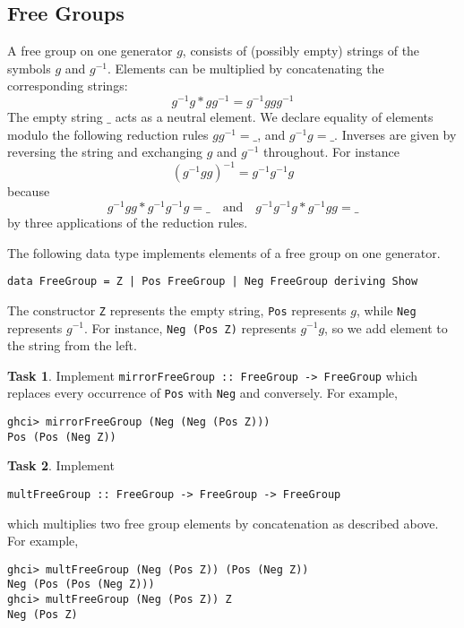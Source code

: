 \documentclass{article}[12pt]
\theoremstyle{definition}
\newtheorem{task}{Task}
\begin{document}
\subsection{Free Groups}
A free group on one generator $g$, consists of (possibly empty) strings of the symbols $g$ and $g^{-1}$. Elements can be multiplied by concatenating the corresponding strings: 
$$g^{-1}g * gg^{-1} = g^{-1}ggg^{-1}$$
The empty string $\_$ acts as a neutral element. 
We declare equality of elements modulo the following reduction rules 
$gg^{-1} = \_$, and $g^{-1}g = \_$.
Inverses are given by reversing the string and exchanging $g$ and $g^{-1}$ throughout. For instance 
$$(g^{-1}g g)^{-1} = g^{-1}g^{-1}g$$
because
$$g^{-1}g g * g^{-1}g^{-1}g = \_ \quad \text{and} \quad g^{-1}g^{-1}g*g^{-1}g g  = \_$$
by three applications of the reduction rules.

The following data type implements elements of a free group on one generator. 
\begin{verbatim}
data FreeGroup = Z | Pos FreeGroup | Neg FreeGroup deriving Show
\end{verbatim}
The constructor \verb|Z| represents the empty string, \verb|Pos| represents $g$, while \verb|Neg| represents $g^{-1}$. For instance, \verb|Neg (Pos Z)| represents $g^{-1}g$, so we add element to the string from the left.

\begin{task}
    Implement \verb|mirrorFreeGroup :: FreeGroup -> FreeGroup| which replaces every occurrence of \verb|Pos| with \verb|Neg| and conversely.
    For example,
    \begin{verbatim}
ghci> mirrorFreeGroup (Neg (Neg (Pos Z)))
Pos (Pos (Neg Z))\end{verbatim}
\end{task}

\begin{task}
    Implement 
    \begin{verbatim}multFreeGroup :: FreeGroup -> FreeGroup -> FreeGroup \end{verbatim} 
    which multiplies two free group elements by concatenation as described above.
    For example,
    \begin{verbatim}
ghci> multFreeGroup (Neg (Pos Z)) (Pos (Neg Z))
Neg (Pos (Pos (Neg Z)))
ghci> multFreeGroup (Neg (Pos Z)) Z
Neg (Pos Z)\end{verbatim}
\end{task}
\end{document}
